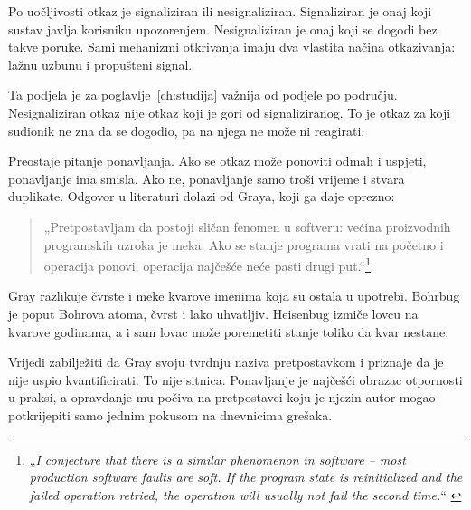 Po uočljivosti otkaz je signaliziran ili nesignaliziran. Signaliziran je
onaj koji sustav javlja korisniku upozorenjem. Nesignaliziran je onaj koji
se dogodi bez takve poruke. Sami mehanizmi otkrivanja imaju dva vlastita
načina otkazivanja: lažnu uzbunu i propušteni signal.

Ta podjela je za poglavlje~\ref{ch:studija} važnija od podjele po području.
Nesignaliziran otkaz nije otkaz koji je gori od signaliziranog. To je otkaz
za koji sudionik ne zna da se dogodio, pa na njega ne može ni reagirati.

Preostaje pitanje ponavljanja. Ako se otkaz može ponoviti odmah i uspjeti,
ponavljanje ima smisla. Ako ne, ponavljanje samo troši vrijeme i stvara
duplikate. Odgovor u literaturi dolazi od Graya, koji ga daje
oprezno\cite{gray1986whystop}:

\begin{quote}
„Pretpostavljam da postoji sličan fenomen u softveru: većina proizvodnih
programskih uzroka je meka. Ako se stanje programa vrati na početno i
operacija ponovi, operacija najčešće neće pasti drugi
put.“\footnote{„\emph{I conjecture that there is a similar phenomenon in
software -- most production software faults are soft. If the program state
is reinitialized and the failed operation retried, the operation will
usually not fail the second time.}“ \cite{gray1986whystop}}
\end{quote}

Gray razlikuje čvrste i meke kvarove imenima koja su ostala u upotrebi.
Bohrbug je poput Bohrova atoma, čvrst i lako uhvatljiv. Heisenbug izmiče
lovcu na kvarove godinama, a i sam lovac može poremetiti stanje toliko da
kvar nestane.

Vrijedi zabilježiti da Gray svoju tvrdnju naziva pretpostavkom i priznaje
da je nije uspio kvantificirati. To nije sitnica. Ponavljanje je najčešći
obrazac otpornosti u praksi, a opravdanje mu počiva na pretpostavci koju
je njezin autor mogao potkrijepiti samo jednim pokusom na dnevnicima
grešaka.


